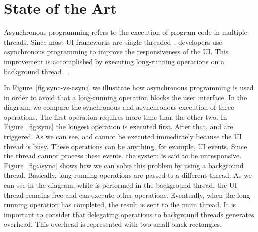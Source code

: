 \documentclass[type=bsc,accentcolor=tud9c]{tudthesis}
\begin{document}
\chapter{State of the Art}
\label{chapter:stateOfTheArt}
Asynchronous programming refers to the execution of program code in multiple threads. Since most UI frameworks are single threaded~\cite{uiSingleThreaded}, developers use asynchronous programming to improve the responsiveness of the UI. This improvement is accomplished by executing long-running operations on a background thread ~\cite{paperAsyncMobile, asyncProgramming}.

In Figure~\ref{fig:sync-vs-async} we illustrate how asynchronous programming is used in order to avoid that a long-running operation blocks the user interface. In the diagram, we compare the synchronous and asynchronous execution of three operations. The first operation requires more time than the other two. In Figure~\ref{fig:sync} the longest operation is executed first. After that,  and  are triggered. As we can see,  and  cannot be executed immediately because the UI thread is busy. These operations can be anything, for example, UI events. Since the thread cannot process these events, the system is said to be unresponsive. Figure~\ref{fig:async} shows how we can solve this problem by using a background thread. Basically, long-running operations are passed to a different thread. As we can see in the diagram, while  is performed in the background thread, the UI thread remains free and can execute other operations. Eventually, when the long-running operation has completed, the result is sent to the main thread. It is important to consider that delegating operations to background threads generates overhead. This overhead is represented with two small black rectangles.
\end{document}
